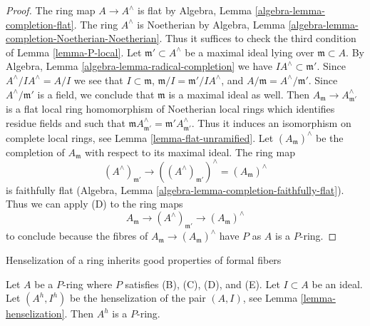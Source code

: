 \begin{proof}
The ring map $A \to A^\wedge$ is flat by
Algebra, Lemma \ref{algebra-lemma-completion-flat}.
The ring $A^\wedge$ is Noetherian by
Algebra, Lemma \ref{algebra-lemma-completion-Noetherian-Noetherian}.
Thus it suffices to check the third condition of
Lemma \ref{lemma-P-local}.
Let $\mathfrak m' \subset A^\wedge$ be a maximal ideal lying over
$\mathfrak m \subset A$.
By Algebra, Lemma \ref{algebra-lemma-radical-completion}
we have $IA^\wedge \subset \mathfrak m'$.
Since $A^\wedge/IA^\wedge = A/I$ we see that
$I \subset \mathfrak m$, $\mathfrak m/I = \mathfrak m'/IA^\wedge$, and
$A/\mathfrak m = A^\wedge/\mathfrak m'$. Since $A^\wedge/\mathfrak m'$
is a field, we conclude that $\mathfrak m$ is a maximal ideal as well.
Then $A_\mathfrak m \to A^\wedge_{\mathfrak m'}$ is a flat local
ring homomorphism of Noetherian local rings
which identifies residue fields and such that
$\mathfrak m A^\wedge_{\mathfrak m'} = \mathfrak m'A^\wedge_{\mathfrak m'}$.
Thus it induces an isomorphism on complete local rings, see
Lemma \ref{lemma-flat-unramified}.
Let $(A_\mathfrak m)^\wedge$ be the completion of $A_\mathfrak m$
with respect to its maximal ideal.
The ring map
$$
(A^\wedge)_{\mathfrak m'} \to
((A^\wedge)_{\mathfrak m'})^\wedge = (A_\mathfrak m)^\wedge
$$
is faithfully flat (Algebra, Lemma
\ref{algebra-lemma-completion-faithfully-flat}). Thus we can apply
(D) to the ring maps
$$
A_\mathfrak m \to (A^\wedge)_{\mathfrak m'} \to (A_\mathfrak m)^\wedge
$$
to conclude because the fibres of
$A_\mathfrak m \to (A_\mathfrak m)^\wedge$
have $P$ as $A$ is a $P$-ring.
\end{proof}

\begin{lemma}
\label{lemma-henselization-pair-P-ring}
\begin{slogan}
Henselization of a ring inherits good properties of formal fibers
\end{slogan}
Let $A$ be a $P$-ring where $P$ satisfies (B), (C), (D), and (E).
Let $I \subset A$ be an ideal. Let $(A^h, I^h)$ be the henselization
of the pair $(A, I)$, see Lemma \ref{lemma-henselization}.
Then $A^h$ is a $P$-ring.
\end{lemma}

